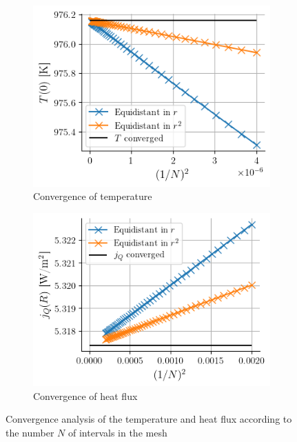 \begin{figure}[h]
    \centering
    \begin{subfigure}{0.48\linewidth}
        \centering
        \includegraphics[width=\linewidth]{figures/var_conv_T.png}
        \caption{Convergence of temperature}
        \label{fig:var_conv_T}
    \end{subfigure}
    \begin{subfigure}{0.48\linewidth}
        \centering
        \includegraphics[width=\linewidth]{figures/var_conv_j.png}
        \caption{Convergence of heat flux}
        \label{fig:var_conv_j}
    \end{subfigure}
    \caption{Convergence analysis of the temperature and heat flux according to the number $N$ of intervals in the mesh}
    \label{fig:var_convergence}
\end{figure}


